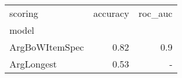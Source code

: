 \begin{tabular}{lrr}
\toprule
scoring &  accuracy & roc\_auc \\
model          &           &         \\
\midrule
ArgBoWItemSpec &      0.82 &     0.9 \\
ArgLongest     &      0.53 &       - \\
\bottomrule
\end{tabular}
